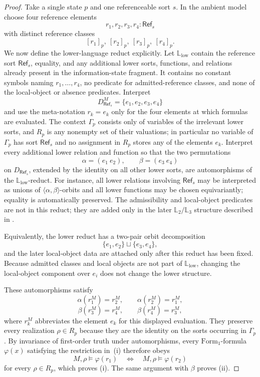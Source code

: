 \begin{proof}
Take a single state $p$ and one referenceable sort $s$. In the ambient model
choose four reference elements
\[
r_1,r_2,r_3,r_4:\mathsf{Ref}_s
\]
with distinct reference classes
\[
[r_1]_p,\ [r_2]_p,\ [r_3]_p,\ [r_4]_p.
\]
We now define the lower-language reduct explicitly. Let $\mathbb L_{\mathrm{low}}$
contain the reference sort $\mathsf{Ref}_s$, equality, and any additional lower
sorts, functions, and relations already present in the information-state
fragment. It contains no constant symbols naming $r_1,\ldots,r_4$, no predicate
for admitted-reference classes, and none of the local-object or absence
predicates. Interpret
\[
D_{\mathsf{Ref}_s}^M=\{e_1,e_2,e_3,e_4\}
\]
and use the meta-notation $r_k=e_k$ only for the four elements at which formulas
are evaluated. The context $\Gamma_p$ consists only of variables of the
irrelevant lower sorts, and $R_p$ is any nonempty set of their valuations; in
particular no variable of $\Gamma_p$ has sort $\mathsf{Ref}_s$ and no assignment
in $R_p$ stores any of the elements $e_k$. Interpret every additional lower
relation and function so that the two permutations
\[
\alpha=(e_1\ e_2),
\qquad
\beta=(e_3\ e_4)
\]
on $D_{\mathsf{Ref}_s}$, extended by the identity on all other lower sorts, are
automorphisms of the $\mathbb L_{\mathrm{low}}$-reduct. For instance, all lower
relations involving $\mathsf{Ref}_s$ may be interpreted as unions of
$\langle\alpha,\beta\rangle$-orbits and all lower functions may be chosen
equivariantly; equality is automatically preserved. The admissibility and
local-object predicates are not in this reduct; they are added only in the later
$\mathbb L_2/\mathbb L_3$ structure described in
.

Equivalently, the lower reduct has a two-pair orbit decomposition
\[
\{e_1,e_2\}\sqcup\{e_3,e_4\},
\]
and the later local-object data are attached only after this reduct has been
fixed. Because admitted classes and local objects are not part of
$\mathbb L_{\mathrm{low}}$, changing the local-object component over $e_i$ does
not change the lower structure.

These automorphisms satisfy
\[
\alpha(r_1^M)=r_2^M,
\qquad
\alpha(r_2^M)=r_1^M,
\]
\[
\beta(r_3^M)=r_4^M,
\qquad
\beta(r_4^M)=r_3^M,
\]
where $r_k^M$ abbreviates the element $e_k$ for this displayed evaluation. They
preserve every realization $\rho\in R_p$ because they are the identity on
the sorts occurring in $\Gamma_p$. By invariance of first-order truth under
automorphisms, every $\mathrm{Form}_1$-formula $\varphi(x)$ satisfying the
restriction in~\textup{(i)} therefore obeys
\[
M,\rho\models\varphi(r_1)
\quad\Longleftrightarrow\quad
M,\rho\models\varphi(r_2)
\]
for every $\rho\in R_p$, which proves \textup{(i)}. The same argument with $\beta$ proves \textup{(ii)}.


\end{proof}
